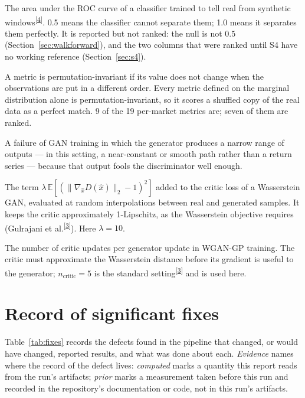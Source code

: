 \documentclass[11pt,a4paper]{article}
\makeatletter
\newcommand{\tcite}[1]{\textsuperscript{[\hyperlink{R:#1}{#1}]}}
\DeclareRobustCommand{\_}{\ifmmode\nfss@text{\textunderscore}\else\textunderscore\allowbreak\fi}
\newcommand{\E}{\mathbb{E}}
\makeatother
\begin{document}
\begin{description}[style=nextline,leftmargin=1.4em,itemsep=4pt,font=\sffamily\bfseries]
\item[Discriminative AUC] The area under the ROC curve of a classifier trained to tell real from synthetic windows\tcite{4}. 0.5 means the classifier cannot separate them; 1.0 means it separates them perfectly. It is reported but not ranked: the null is not $0.5$ (Section~\ref{sec:walkforward}), and the two columns that were ranked until S4 have no working reference (Section~\ref{sec:s4}).
\item[Permutation invariance] A metric is permutation-invariant if its value does not change when the observations are put in a different order. Every metric defined on the marginal distribution alone is permutation-invariant, so it scores a shuffled copy of the real data as a perfect match. 9 of the 19 per-market metrics are; seven of them are ranked.
\item[Mode collapse] A failure of GAN training in which the generator produces a narrow range of outputs --- in this setting, a near-constant or smooth path rather than a return series --- because that output fools the discriminator well enough.
\item[Gradient penalty] The term $\lambda\,\E[(\|\nabla_{\hat x}D(\hat x)\|_2-1)^2]$ added to the critic loss of a Wasserstein GAN, evaluated at random interpolations between real and generated samples. It keeps the critic approximately 1-Lipschitz, as the Wasserstein objective requires (Gulrajani et al.\tcite{3}). Here $\lambda=10$.
\item[$n_\text{critic}$] The number of critic updates per generator update in WGAN-GP training. The critic must approximate the Wasserstein distance before its gradient is useful to the generator; $n_\text{critic}=5$ is the standard setting\tcite{3} and is used here.
\end{description}

\clearpage
\appendix
\renewcommand{\thesection}{\Alph{section}}

\section{Record of significant fixes}
\label{app:fixes}
Table~\ref{tab:fixes} records the defects found in the pipeline that changed, or would have changed, reported results, and what was done about each. \emph{Evidence} names where the record of the defect lives: \emph{computed} marks a quantity this report reads from the run's artifacts; \emph{prior} marks a measurement taken before this run and recorded in the repository's documentation or code, not in this run's artifacts.
\end{document}
